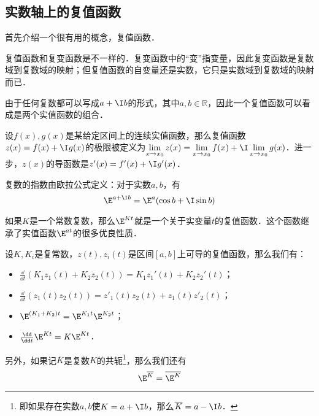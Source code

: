 

\subsection{实数轴上的复值函数}

首先介绍一个很有用的概念，复值函数．

复值函数和复变函数是不一样的．复变函数中的“变”指变量，因此复变函数是复数域到复数域的映射；但复值函数的自变量还是实数，它只是实数域到复数域的映射而已．

由于任何复数都可以写成$a+\I b$的形式，其中$a, b\in\mathbb{R}$，因此一个复值函数可以看成是两个实值函数的组合．

设$f(x), g(x)$是某给定区间上的连续实值函数，那么复值函数$z(x)=f(x)+\I g(x)$的极限被定义为$\lim\limits_{x\to x_0}z(x)=\lim\limits_{x\to x_0}f(x)+\I\lim\limits_{x\to x_0}g(x)$．进一步，$z(x)$的导函数是$z'(x)=f'(x)+\I g'(x)$．

复数的指数由欧拉公式定义：对于实数$a, b$，有
\begin{equation}
\E^{a+\I b}=\E^a(\cos b+\I\sin b)
\end{equation}

如果$K$是一个常数复数，那么$\E^{Kt}$就是一个关于实变量$t$的复值函数．这个函数继承了实值函数$\E^{at}$的很多优良性质．

\begin{theorem}{}
设$K, K_i$是复常数，$z(t), z_i(t)$是区间$[a, b]$上可导的复值函数，那么我们有：
\begin{itemize}
\item $\frac{\dd }{\dd t}(K_1z_1(t)+K_2z_2(t))=K_1z_1'(t)+K_2z_2'(t)$；
\item $\frac{\dd}{\dd t}(z_1(t)z_2(t))=z'_1(t)z_2(t)+z_1(t)z'_2(t)$；
\item $\E^{(K_1+K_2)t}=\E^{K_1t}\E^{K_2t}$；
\item $\frac{\dd }{\dd t}\E^{Kt}=K\E^{Kt}$．
\end{itemize}
\end{theorem}

另外，如果记$\overline{K}$是复数$K$的共轭\footnote{即如果存在实数$a, b$使$K=a+\I b$，那么$\overline{K}=a-\I b$．}，那么我们还有
\begin{equation}
\E^{\overline{K}}=\overline{\E^K}
\end{equation}

